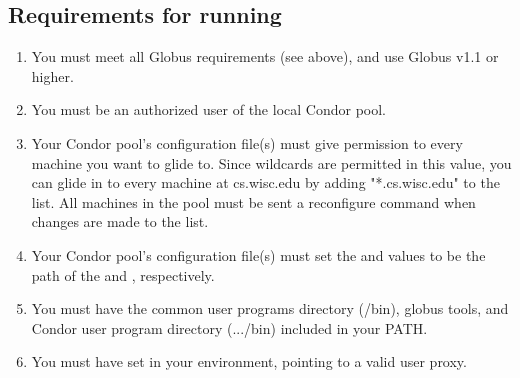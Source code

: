 \subsection{Requirements for running }
\begin{enumerate}
\item You must meet all Globus requirements (see above), and use Globus v1.1 or higher.

\item You must be an authorized user of the local Condor pool.

\item Your Condor pool's configuration file(s) must give 
  permission to every machine you want to glide to. Since wildcards
  are permitted in this value, you can glide in to every machine at
  cs.wisc.edu by adding "*.cs.wisc.edu" to the  list.
  All machines in the pool must be sent a reconfigure command when
  changes are made to the  list.

\item Your Condor pool's configuration file(s) must set the 
and  values to be the path of the  and
, respectively.


\item You must have the common user programs directory (/bin), globus tools, 
and Condor user program directory (.../bin) included in your PATH.

\item You must have  set in your environment, pointing to a valid user proxy.

\end{enumerate}

